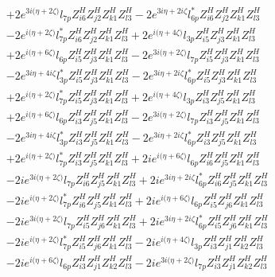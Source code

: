 \begin{align}
 &+2 e^{3 i \Big(\eta +2 \zeta \Big)} l_{7p} Z_{{i 6}}^{H} Z_{{j 2}}^{H} Z_{{k 1}}^{H} Z_{{l 3}}^{H} -2 e^{3 i \eta +2 i \zeta } l_{6p}^* Z_{{i 6}}^{H} Z_{{j 2}}^{H} Z_{{k 1}}^{H} Z_{{l 3}}^{H} \nonumber \\ 
 &-2 e^{i \Big(\eta +2 \zeta \Big)} l_{7p}^* Z_{{i 6}}^{H} Z_{{j 2}}^{H} Z_{{k 1}}^{H} Z_{{l 3}}^{H} +2 e^{i \Big(\eta +4 \zeta \Big)} l_{3p} Z_{{i 5}}^{H} Z_{{j 3}}^{H} Z_{{k 1}}^{H} Z_{{l 3}}^{H} \nonumber \\ 
 &+2 e^{i \Big(\eta +6 \zeta \Big)} l_{6p} Z_{{i 5}}^{H} Z_{{j 3}}^{H} Z_{{k 1}}^{H} Z_{{l 3}}^{H} -2 e^{3 i \Big(\eta +2 \zeta \Big)} l_{7p} Z_{{i 5}}^{H} Z_{{j 3}}^{H} Z_{{k 1}}^{H} Z_{{l 3}}^{H} \nonumber \\ 
 &-2 e^{3 i \eta +4 i \zeta } l_{3p}^* Z_{{i 5}}^{H} Z_{{j 3}}^{H} Z_{{k 1}}^{H} Z_{{l 3}}^{H} -2 e^{3 i \eta +2 i \zeta } l_{6p}^* Z_{{i 5}}^{H} Z_{{j 3}}^{H} Z_{{k 1}}^{H} Z_{{l 3}}^{H} \nonumber \\ 
 &+2 e^{i \Big(\eta +2 \zeta \Big)} l_{7p}^* Z_{{i 5}}^{H} Z_{{j 3}}^{H} Z_{{k 1}}^{H} Z_{{l 3}}^{H} +2 e^{i \Big(\eta +4 \zeta \Big)} l_{3p} Z_{{i 3}}^{H} Z_{{j 5}}^{H} Z_{{k 1}}^{H} Z_{{l 3}}^{H} \nonumber \\ 
 &+2 e^{i \Big(\eta +6 \zeta \Big)} l_{6p} Z_{{i 3}}^{H} Z_{{j 5}}^{H} Z_{{k 1}}^{H} Z_{{l 3}}^{H} -2 e^{3 i \Big(\eta +2 \zeta \Big)} l_{7p} Z_{{i 3}}^{H} Z_{{j 5}}^{H} Z_{{k 1}}^{H} Z_{{l 3}}^{H} \nonumber \\ 
 &-2 e^{3 i \eta +4 i \zeta } l_{3p}^* Z_{{i 3}}^{H} Z_{{j 5}}^{H} Z_{{k 1}}^{H} Z_{{l 3}}^{H} -2 e^{3 i \eta +2 i \zeta } l_{6p}^* Z_{{i 3}}^{H} Z_{{j 5}}^{H} Z_{{k 1}}^{H} Z_{{l 3}}^{H} \nonumber \\ 
 &+2 e^{i \Big(\eta +2 \zeta \Big)} l_{7p}^* Z_{{i 3}}^{H} Z_{{j 5}}^{H} Z_{{k 1}}^{H} Z_{{l 3}}^{H} +2 i e^{i \Big(\eta +6 \zeta \Big)} l_{6p} Z_{{i 6}}^{H} Z_{{j 5}}^{H} Z_{{k 1}}^{H} Z_{{l 3}}^{H} \nonumber \\ 
 &-2 i e^{3 i \Big(\eta +2 \zeta \Big)} l_{7p} Z_{{i 6}}^{H} Z_{{j 5}}^{H} Z_{{k 1}}^{H} Z_{{l 3}}^{H} +2 i e^{3 i \eta +2 i \zeta } l_{6p}^* Z_{{i 6}}^{H} Z_{{j 5}}^{H} Z_{{k 1}}^{H} Z_{{l 3}}^{H} \nonumber \\ 
 &-2 i e^{i \Big(\eta +2 \zeta \Big)} l_{7p}^* Z_{{i 6}}^{H} Z_{{j 5}}^{H} Z_{{k 1}}^{H} Z_{{l 3}}^{H} +2 i e^{i \Big(\eta +6 \zeta \Big)} l_{6p} Z_{{i 5}}^{H} Z_{{j 6}}^{H} Z_{{k 1}}^{H} Z_{{l 3}}^{H} \nonumber \\ 
 &-2 i e^{3 i \Big(\eta +2 \zeta \Big)} l_{7p} Z_{{i 5}}^{H} Z_{{j 6}}^{H} Z_{{k 1}}^{H} Z_{{l 3}}^{H} +2 i e^{3 i \eta +2 i \zeta } l_{6p}^* Z_{{i 5}}^{H} Z_{{j 6}}^{H} Z_{{k 1}}^{H} Z_{{l 3}}^{H} \nonumber \\ 
 &-2 i e^{i \Big(\eta +2 \zeta \Big)} l_{7p}^* Z_{{i 5}}^{H} Z_{{j 6}}^{H} Z_{{k 1}}^{H} Z_{{l 3}}^{H} -2 i e^{i \Big(\eta +4 \zeta \Big)} l_{3p} Z_{{i 3}}^{H} Z_{{j 1}}^{H} Z_{{k 2}}^{H} Z_{{l 3}}^{H} \nonumber \\ 
 &-2 i e^{i \Big(\eta +6 \zeta \Big)} l_{6p} Z_{{i 3}}^{H} Z_{{j 1}}^{H} Z_{{k 2}}^{H} Z_{{l 3}}^{H} -2 i e^{3 i \Big(\eta +2 \zeta \Big)} l_{7p} Z_{{i 3}}^{H} Z_{{j 1}}^{H} Z_{{k 2}}^{H} Z_{{l 3}}^{H} \nonumber 
\end{align} 
